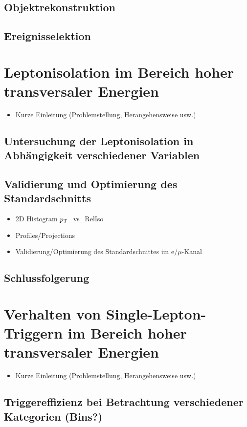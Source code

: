 \documentclass[12pt,a4paper]{article}
\newcommand{\pt}{$p_{\text T}$}
\begin{document}
\subsection{Objektrekonstruktion}
\subsection{Ereignisselektion}
\section{Leptonisolation im Bereich hoher transversaler Energien}
\begin{itemize}
\item Kurze Einleitung (Problemstellung, Herangehensweise usw.)
\end{itemize}
\subsection{Untersuchung der Leptonisolation in Abhängigkeit verschiedener Variablen}
\subsection{Validierung und Optimierung des Standardschnitts}
\begin{itemize}
\item 2D Histogram \pt \_vs\_RelIso
\item Profiles/Projections
\item Validierung/Optimierung des Standardschnittes im e/$\mu$-Kanal
\end{itemize}
\subsection{Schlussfolgerung}
\section{Verhalten von Single-Lepton-Triggern im Bereich hoher transversaler Energien}
\begin{itemize}
\item Kurze Einleitung (Problemstellung, Herangehensweise usw.)
\end{itemize}
\subsection{Triggereffizienz bei Betrachtung verschiedener Kategorien (Bins?)}
\end{document}
